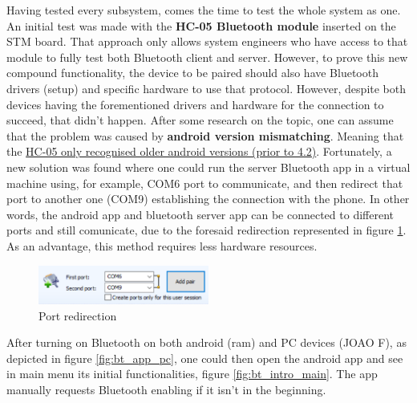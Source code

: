 Having tested every subsystem, comes the time to test the whole system as one.\\
%
An initial test was made with the \textbf{HC-05 Bluetooth module} inserted on the STM board. That approach only allows system engineers who have access to that module to fully test both Bluetooth client and server. 
%
However, to prove this new compound functionality, the device to be paired should also have Bluetooth drivers (setup) and specific hardware to use that protocol.
%
However, despite both devices having the forementioned drivers and hardware for the connection to succeed, that didn't happen. After some research on the topic, one can assume that the problem was caused by \textbf{android version mismatching}. Meaning that the \underline{HC-05 only recognised older android versions (prior to 4.2)}.
%
Fortunately, a new solution was found where one could run the server Bluetooth app in a virtual machine using, for example, COM6 port to communicate, and then redirect that port to another one (COM9) establishing the connection with the phone. In other words, the android app and bluetooth server app can be connected to different ports and still comunicate, due to the foresaid redirection represented in figure \ref{fig:port-red}. As an advantage, this method requires less hardware resources.
%

\begin{figure}[!ht]
\centering
\includegraphics[width=0.5\textwidth]{img/port-red.png}
\caption{\label{fig:port-red}Port redirection}
\end{figure}
%
After turning on Bluetooth on both android (ram) and PC devices (JOAO F), as depicted in figure \ref{fig:bt_app_pc}, one could then open the android app and see in main menu its initial functionalities, figure \ref{fig:bt_intro_main}. The app manually requests Bluetooth enabling if it isn't in the beginning.
%

